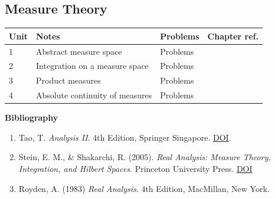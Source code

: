 \subsection*{Measure Theory}

\begin{tabular}{llll}
  \hline
  Unit & Notes & Problems & Chapter ref. \\
  \hline
  1 & Abstract measure space & Problems & \\
  2 & Integration on a measure space & Problems & \\
  3 & Product measures & Problems & \\
  4 & Absolute continuity of measures & Problems & \\
  \hline
\end{tabular}

\textbf{Bibliography}

\begin{enumerate}
  \item Tao, T. \emph{Analysis II}. 4th Edition, Springer Singapore. \href{https://doi.org/10.1007/978-981-19-7284-3}{DOI}.
  \item Stein, E. M., \& Shakarchi, R. (2005). \emph{Real Analysis: Measure Theory, Integration, and Hilbert Spaces}. Princeton University Press. \href{https://doi.org/10.2307/j.ctvd58v18}{DOI}
  \item Royden, A. (1983) \emph{Real Analysis}. 4th Edition, MacMillan, New York.
\end{enumerate}
